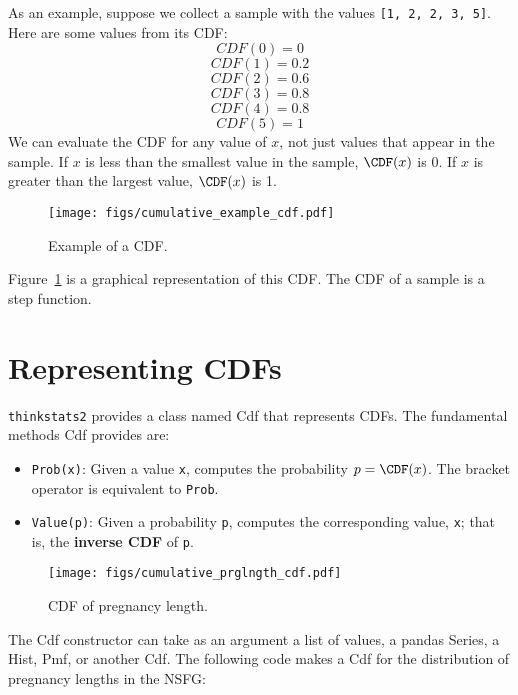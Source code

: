 \documentclass[12pt]{book}
\begin{document}
As an example, suppose we collect a sample with the values 
{\tt [1, 2, 2, 3, 5]}.  Here are some values from its CDF:
%
\[ CDF(0) = 0 \]
%
\[ CDF(1) = 0.2\]
%
\[ CDF(2) = 0.6\]
%
\[ CDF(3) = 0.8\]
%
\[ CDF(4) = 0.8\]
%
\[ CDF(5) = 1\]
%
We can evaluate the CDF for any value of $x$, not just
values that appear in the sample.
If $x$ is less than the smallest value in the sample, $\CDF(x)$ is 0.
If $x$ is greater than the largest value, $\CDF(x)$ is 1.

\begin{figure}
\centerline{\texttt{[image: figs/cumulative\_example\_cdf.pdf]}}
\caption{Example of a CDF.}
\label{example_cdf}
\end{figure}

Figure~\ref{example_cdf} is a graphical representation of this CDF.
The CDF of a sample is a step function.


\section{Representing CDFs}

{\tt thinkstats2} provides a class named Cdf that represents
CDFs.  The fundamental methods Cdf provides are:

\begin{itemize}

\item {\tt Prob(x)}: Given a value {\tt x}, computes the probability
  $p = \CDF(x)$.  The bracket operator is equivalent to {\tt Prob}.

\item {\tt Value(p)}: Given a probability {\tt p}, computes the
corresponding value, {\tt x}; that is, the {\bf inverse CDF} of {\tt p}.

\end{itemize}

\begin{figure}
\centerline{\texttt{[image: figs/cumulative\_prglngth\_cdf.pdf]}}
\caption{CDF of pregnancy length.}
\label{cumulative_prglngth_cdf}
\end{figure}

The Cdf constructor can take as an argument a list of values,
a pandas Series, a Hist, Pmf, or another Cdf.  The following
code makes a Cdf for the distribution of pregnancy lengths in
the NSFG:
\end{document}
